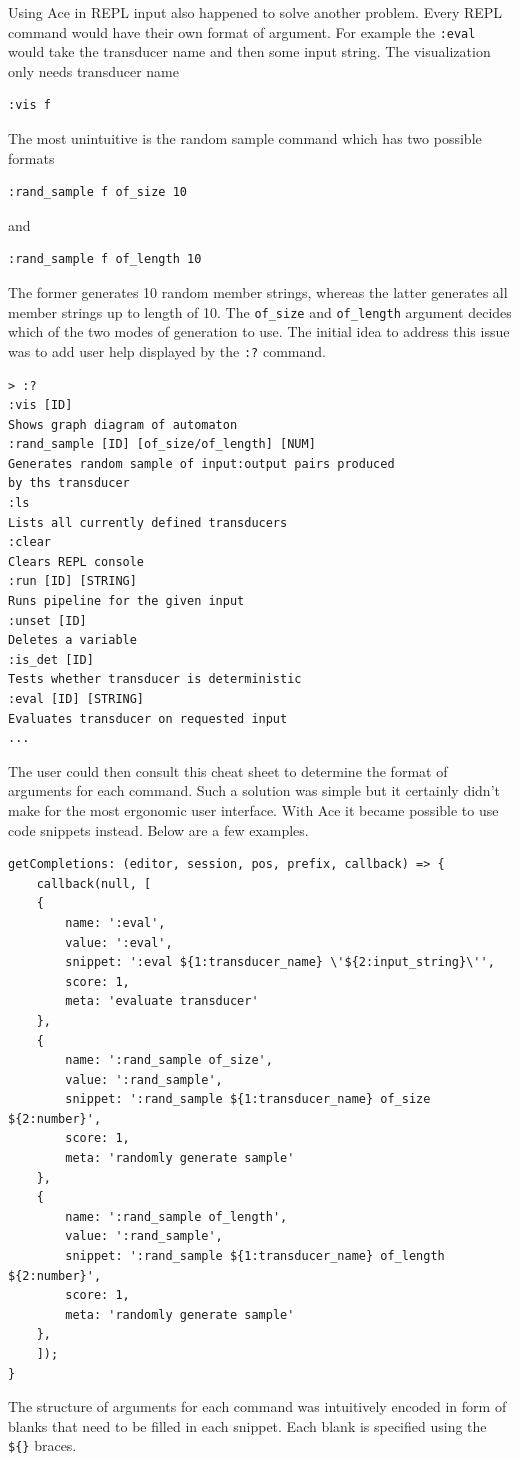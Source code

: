 Using Ace in REPL input also happened to solve another problem. Every REPL command would have their own format of argument. For example the     \texttt{:eval} would take the transducer name and then some input string. The visualization only needs transducer name
\begin{lstlisting}
:vis f
\end{lstlisting}
The most unintuitive is the random sample command which has two possible formats
\begin{lstlisting}
:rand_sample f of_size 10
\end{lstlisting}
and
\begin{lstlisting}
:rand_sample f of_length 10
\end{lstlisting}
The former generates 10 random member strings, whereas the latter generates all member strings up to length of 10.
The     \texttt{of\_size} and     \texttt{of\_length} argument decides which of the two modes of generation to use. The initial idea to address this issue was to add user help displayed by the     \texttt{:?} command.
\begin{lstlisting}
> :?
:vis [ID]
Shows graph diagram of automaton
:rand_sample [ID] [of_size/of_length] [NUM]
Generates random sample of input:output pairs produced 
by ths transducer
:ls
Lists all currently defined transducers
:clear
Clears REPL console
:run [ID] [STRING]
Runs pipeline for the given input
:unset [ID]
Deletes a variable
:is_det [ID]
Tests whether transducer is deterministic
:eval [ID] [STRING]
Evaluates transducer on requested input
...
\end{lstlisting}
The user could then consult this cheat sheet to determine the format of arguments for each command. Such a solution was simple but it certainly didn't make for the most ergonomic user interface. With Ace it became possible to use code snippets instead.
Below are a few examples.
\begin{lstlisting}
getCompletions: (editor, session, pos, prefix, callback) => {
    callback(null, [
    {
        name: ':eval',
        value: ':eval',
        snippet: ':eval ${1:transducer_name} \'${2:input_string}\'',
        score: 1,
        meta: 'evaluate transducer'
    },
    {
        name: ':rand_sample of_size',
        value: ':rand_sample',
        snippet: ':rand_sample ${1:transducer_name} of_size ${2:number}',
        score: 1,
        meta: 'randomly generate sample'
    },
    {
        name: ':rand_sample of_length',
        value: ':rand_sample',
        snippet: ':rand_sample ${1:transducer_name} of_length ${2:number}',
        score: 1,
        meta: 'randomly generate sample'
    },
    ]);
}
\end{lstlisting}
The structure of arguments for each command was intuitively encoded in form
of blanks that need to be filled in each snippet. Each blank is specified using the \texttt{\$\{\}} braces.


